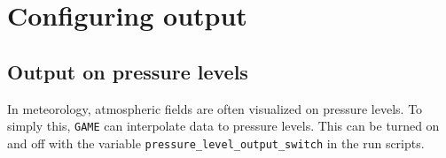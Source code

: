 \documentclass[10pt]{report}
\begin{document}
\section{Configuring output}
\label{sec:configuring_output}

\subsection{Output on pressure levels}
\label{sec:output_on_pressure_levels}

In meteorology, atmospheric fields are often visualized on pressure levels. To simply this, \texttt{GAME} can interpolate data to pressure levels. This can be turned on and off with the variable \texttt{pressure\_level\_output\_switch} in the run scripts.

\appendix

\printbibliography
\end{document}
